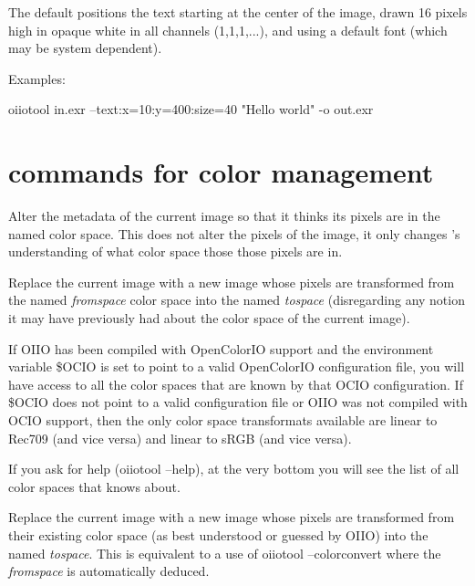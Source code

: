 The default positions the text starting at the center of the image,
drawn 16 pixels high in opaque white in all channels (1,1,1,...), and
using a default font (which may be system dependent).

\noindent Examples: 

\begin{code}
    oiiotool in.exr --text:x=10:y=400:size=40 "Hello world" -o out.exr
\end{code}

\apiend



\section{\oiiotool commands for color management}

Alter the metadata of the current image so that it thinks its pixels
are in the named color space.  This does not alter the pixels of the
image, it only changes \oiiotool's understanding of what color
space those those pixels are in.
\apiend

Replace the current image with a new image whose pixels are transformed
from the named \emph{fromspace} color space into the named
\emph{tospace} (disregarding any notion it may have previously had 
about the color space of the current image).  

If OIIO has been compiled with OpenColorIO support and the environment
variable {\cf \$OCIO} is set to point to a valid OpenColorIO
configuration file, you will have access to all the color spaces that
are known by that OCIO configuration.  If {\cf \$OCIO} does not point to
a valid configuration file or OIIO was not compiled with OCIO support,
then the only color space transformats available are {\cf linear} to
{\cf Rec709} (and vice versa) and {\cf linear} to {\cf sRGB} (and vice
versa).

If you ask for \oiiotool help ({\cf oiiotool --help}), at the very
bottom you will see the list of all color spaces that \oiiotool knows
about.
\apiend

Replace the current image with a new image whose pixels are transformed
from their existing color space (as best understood or guessed by OIIO)
into the named \emph{tospace}.  This is equivalent to a use of
{\cf oiiotool --colorconvert} where the \emph{fromspace} is
automatically deduced.
\apiend

